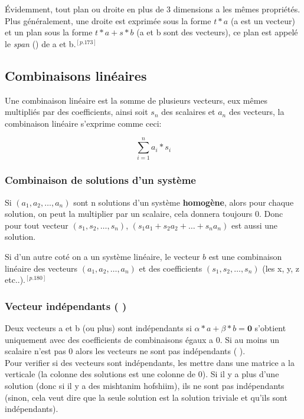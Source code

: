 \documentclass[12pt]{article}
\begin{document}
Évidemment, tout plan ou droite en plus de 3 dimensions a les mêmes propriétés. Plus généralement, une droite est exprimée sous la forme $t*a$ (a est un vecteur) et un plan sous la forme $t*a + s*b$ (a et b sont des vecteurs), ce plan est appelé le {\em span} () de a et b.$^{[p.173]}$ 

\subsection{Combinaisons linéaires}
Une combinaison linéaire est la somme de plusieurs vecteurs, eux mêmes multipliés par des coefficients, ainsi soit $s_n$ des scalaires et $a_n$ des vecteurs, la combinaison linéaire s'exprime comme ceci:

\begin{equation}
  \sum_{i=1}^{n} a_i * s_i
\end{equation}  

\subsubsection{Combinaison de solutions d'un système}

Si $(a_1, a_2, \ldots, a_n)$ sont n solutions d'un système \textbf{homogène}, alors pour chaque solution, on peut la multiplier par un scalaire, cela donnera toujours 0. Donc pour tout vecteur $(s_1, s_2, \ldots, s_n) $, $(s_1a_1 + s_2a_2 + \ldots + s_na_n)$ est aussi une solution.  

Si d'un autre coté on a un système linéaire, le vecteur $b$ est une combinaison linéaire des vecteurs $(a_1, a_2, \ldots, a_n)$ et des coefficients $(s_1, s_2, \ldots, s_n)$ (les x, y, z etc..).$^{[p.180]}$

\subsubsection{Vecteur indépendants ( )}
Deux vecteurs a et b (ou plus) sont indépendants si $\alpha*a + \beta*b = \textbf{0}$ s'obtient uniquement avec des coefficients de combinaisons égaux a 0. Si au moins un scalaire n'est pas 0 alors les vecteurs ne sont pas indépendants (  ). \\

Pour verifier si des vecteurs sont indépendants, les mettre dans une matrice a la verticale (la colonne des solutions est une colonne de 0). Si il y a plus d'une solution (donc si il y a des mishtanim hofshiim), ils ne sont pas indépendants (sinon, cela veut dire que la seule solution est la solution triviale et qu'ils sont indépendants).\\
\end{document}
